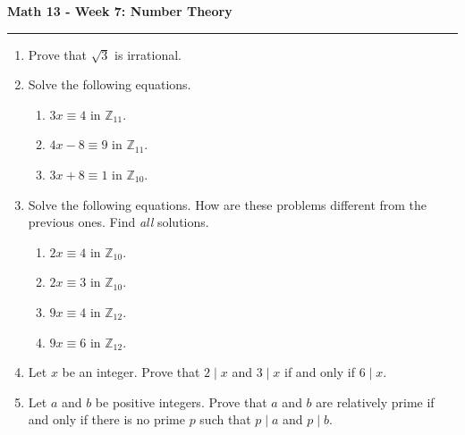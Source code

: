 \documentclass[12pt]{report}
\theoremstyle{definition}
\newcommand{\integers}{\mathbb{Z}}
\begin{document}
\begin{center}
{\bf \Large Math 13 - Week 7: Number Theory}
\vspace{0.2cm}
\hrule
\end{center}

\begin{enumerate}

\item Prove that $\sqrt{3}$ is irrational.

\vfill

\item Solve the following equations.
\begin{enumerate}
	\item $3x \equiv 4$ in $\integers_{11}$.
	\item $4x-8 \equiv 9$ in $\integers_{11}$.
	\item $3x+8 \equiv 1$ in $\integers_{10}$.
\end{enumerate}

\vfill

\item Solve the following equations. How are these problems different from the previous ones. Find \textit{all} solutions.
\begin{enumerate}
	\item $2x \equiv 4$ in $\integers_{10}$.
	\item $2x \equiv 3$ in $\integers_{10}$.
	\item $9x \equiv 4$ in $\integers_{12}$.
	\item $9x \equiv 6$ in $\integers_{12}$.
\end{enumerate}

\vfill

\item Let $x$ be an integer. Prove that $2\mid x$ and $3\mid x$ if and only if $6\mid x$.

\vfill

\item Let $a$ and $b$ be positive integers. Prove that $a$ and $b$ are relatively prime if and only if there is no prime $p$ such that $p\mid a$ and $p\mid b$.

\vfill



\end{enumerate}
\end{document}
